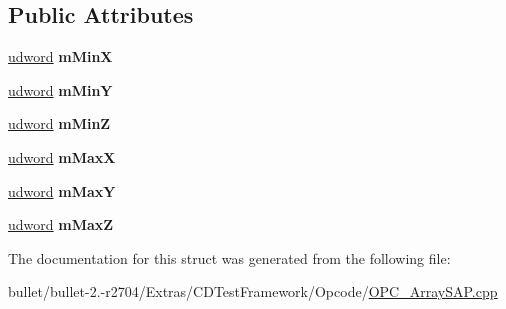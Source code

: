 \subsection*{Public Attributes}
\begin{DoxyCompactItemize}
\item 
\hypertarget{struct_opcode_1_1_i_a_a_b_b_a7d7798f2c78cc955110e0edb58fba593}{\hyperlink{_ice_types_8h_a44c6f1920ba5551225fb534f9d1a1733}{udword} {\bfseries m\+Min\+X}}\label{struct_opcode_1_1_i_a_a_b_b_a7d7798f2c78cc955110e0edb58fba593}

\item 
\hypertarget{struct_opcode_1_1_i_a_a_b_b_af9d835d93e683700d875b1c69a7bfe83}{\hyperlink{_ice_types_8h_a44c6f1920ba5551225fb534f9d1a1733}{udword} {\bfseries m\+Min\+Y}}\label{struct_opcode_1_1_i_a_a_b_b_af9d835d93e683700d875b1c69a7bfe83}

\item 
\hypertarget{struct_opcode_1_1_i_a_a_b_b_a989ef612d9103cf403d3668b7d5ca710}{\hyperlink{_ice_types_8h_a44c6f1920ba5551225fb534f9d1a1733}{udword} {\bfseries m\+Min\+Z}}\label{struct_opcode_1_1_i_a_a_b_b_a989ef612d9103cf403d3668b7d5ca710}

\item 
\hypertarget{struct_opcode_1_1_i_a_a_b_b_ad0dda05b091728f15b310051cbdc7fb7}{\hyperlink{_ice_types_8h_a44c6f1920ba5551225fb534f9d1a1733}{udword} {\bfseries m\+Max\+X}}\label{struct_opcode_1_1_i_a_a_b_b_ad0dda05b091728f15b310051cbdc7fb7}

\item 
\hypertarget{struct_opcode_1_1_i_a_a_b_b_a417e3d9ed3d36495fa49ea2c48773126}{\hyperlink{_ice_types_8h_a44c6f1920ba5551225fb534f9d1a1733}{udword} {\bfseries m\+Max\+Y}}\label{struct_opcode_1_1_i_a_a_b_b_a417e3d9ed3d36495fa49ea2c48773126}

\item 
\hypertarget{struct_opcode_1_1_i_a_a_b_b_a3f97b762df34a03a1fc8ebe58ea39177}{\hyperlink{_ice_types_8h_a44c6f1920ba5551225fb534f9d1a1733}{udword} {\bfseries m\+Max\+Z}}\label{struct_opcode_1_1_i_a_a_b_b_a3f97b762df34a03a1fc8ebe58ea39177}

\end{DoxyCompactItemize}


The documentation for this struct was generated from the following file\+:\begin{DoxyCompactItemize}
\item 
bullet/bullet-\/2.-\/r2704/\+Extras/\+C\+D\+Test\+Framework/\+Opcode/\hyperlink{_o_p_c___array_s_a_p_8cpp}{O\+P\+C\+\_\+\+Array\+S\+A\+P.\+cpp}\end{DoxyCompactItemize}
